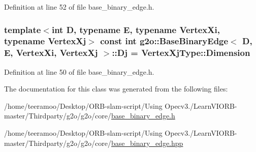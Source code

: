 Definition at line 52 of file base\+\_\+binary\+\_\+edge.\+h.

\subsubsection[{\texorpdfstring{Dj}{Dj}}]{\setlength{\rightskip}{0pt plus 5cm}template$<$int D, typename E, typename Vertex\+Xi, typename Vertex\+Xj$>$ const int {\bf g2o\+::\+Base\+Binary\+Edge}$<$ D, E, Vertex\+Xi, Vertex\+Xj $>$\+::Dj = Vertex\+Xj\+Type\+::\+Dimension\hspace{0.3cm}{\ttfamily [static]}}\hypertarget{classg2o_1_1BaseBinaryEdge_ab718b94950a34d589371fe6f5583b259}{}\label{classg2o_1_1BaseBinaryEdge_ab718b94950a34d589371fe6f5583b259}


Definition at line 50 of file base\+\_\+binary\+\_\+edge.\+h.



The documentation for this class was generated from the following files\+:\begin{DoxyCompactItemize}
\item 
/home/teeramoo/\+Desktop/\+O\+R\+B-\/slam-\/script/\+Using Opecv3./\+Learn\+V\+I\+O\+R\+B-\/master/\+Thirdparty/g2o/g2o/core/\hyperlink{base__binary__edge_8h}{base\+\_\+binary\+\_\+edge.\+h}\item 
/home/teeramoo/\+Desktop/\+O\+R\+B-\/slam-\/script/\+Using Opecv3./\+Learn\+V\+I\+O\+R\+B-\/master/\+Thirdparty/g2o/g2o/core/\hyperlink{base__binary__edge_8hpp}{base\+\_\+binary\+\_\+edge.\+hpp}\end{DoxyCompactItemize}

